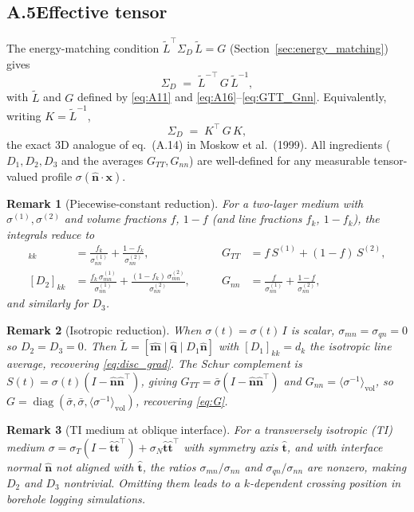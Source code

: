 \documentclass[11pt]{article}
\newtheorem{remark}{Remark}
\newcommand{\nn}{\hat{\bm{n}}}
\newcommand{\mm}{\hat{\bm{m}}}
\newcommand{\qq}{\hat{\bm{q}}}
\newcommand{\tL}{\widetilde{L}}
\newcommand{\SD}{\Sigma_D}
\newcommand{\sbar}{\bar{\sigma}}
\newcommand{\invs}{\langle\sigma^{-1}\rangle_{\mathrm{vol}}}
\newcommand{\GTT}{G_{TT}}
\newcommand{\Gnn}{G_{nn}}
\begin{document}
\subsection*{A.5\quad Effective tensor}

The energy-matching condition
$\tL^\top\SD\,\tL = G$ (Section~\ref{sec:energy_matching}) gives
\begin{equation}\label{eq:A17}
  \boxed{
  \SD \;=\; \tL^{-\top}\,G\,\tL^{-1},
  }
\end{equation}
with $\tL$ and $G$ defined by \eqref{eq:A11} and \eqref{eq:A16}--\eqref{eq:GTT_Gnn}.
Equivalently, writing $K = \tL^{-1}$,
\begin{equation}\label{eq:A18}
  \SD \;=\; K^\top\,G\,K,
\end{equation}
the exact 3D analogue of eq.~(A.14) in Moskow et al.\ (1999).  All
ingredients ($D_1,D_2,D_3$ and the averages $\GTT,\Gnn$) are well-defined
for any measurable tensor-valued profile $\sigma(\nn\cdot\bm{x})$.

\begin{remark}[Piecewise-constant reduction]
For a two-layer medium with $\sigma^{(1)},\sigma^{(2)}$ and volume fractions
$f$, $1-f$ (and line fractions $f_k$, $1-f_k$), the integrals reduce to
\begin{align*}
  [D_1]_{kk} &= \frac{f_k}{\sigma_{nn}^{(1)}} + \frac{1-f_k}{\sigma_{nn}^{(2)}},
  &\qquad
  \GTT &= f\,S^{(1)} + (1-f)\,S^{(2)},\\
  [D_2]_{kk} &= \frac{f_k\,\sigma_{mn}^{(1)}}{\sigma_{nn}^{(1)}} + \frac{(1-f_k)\,\sigma_{mn}^{(2)}}{\sigma_{nn}^{(2)}},
  &\qquad
  \Gnn &= \frac{f}{\sigma_{nn}^{(1)}} + \frac{1-f}{\sigma_{nn}^{(2)}},
\end{align*}
and similarly for $D_3$.
\end{remark}

\begin{remark}[Isotropic reduction]
When $\sigma(t)=\sigma(t)\,I$ is scalar, $\sigma_{mn}=\sigma_{qn}=0$ so
$D_2=D_3=0$.  Then $\tL=[\mm\mid\qq\mid D_1\nn]$ with $[D_1]_{kk}=d_k$
the isotropic line average, recovering \eqref{eq:disc_grad}.  The Schur
complement is $S(t)=\sigma(t)(I-\nn\nn^\top)$, giving $\GTT=\sbar(I-\nn\nn^\top)$
and $\Gnn=\invs$, so $G=\operatorname{diag}(\sbar,\sbar,\invs)$, recovering \eqref{eq:G}.
\end{remark}

\begin{remark}[TI medium at oblique interface]
For a transversely isotropic (TI) medium $\sigma=\sigma_T(I-\hat{\bm{t}}\hat{\bm{t}}^\top)
+\sigma_N\hat{\bm{t}}\hat{\bm{t}}^\top$ with symmetry axis $\hat{\bm{t}}$,
and with interface normal $\nn$ not aligned with $\hat{\bm{t}}$, the
ratios $\sigma_{mn}/\sigma_{nn}$ and $\sigma_{qn}/\sigma_{nn}$ are nonzero,
making $D_2$ and $D_3$ nontrivial.  Omitting them leads to a $k$-dependent
crossing position in borehole logging simulations.
\end{remark}
\end{document}
